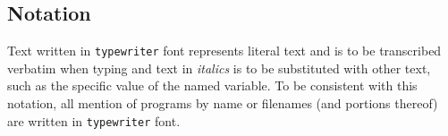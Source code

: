 \documentclass{article}
\begin{document}
\subsection{Notation}

Text written in {\tt typewriter} font represents literal text and is to be transcribed verbatim when typing and text in {\em italics} is to be substituted with other text, such as the specific value of the named variable.
To be consistent with this notation, all mention of programs by name or filenames (and portions thereof) are written in {\tt typewriter} font.



%

%













%

%


\end{document}

